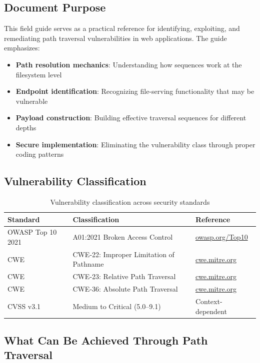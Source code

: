 \documentclass[11pt,letterpaper]{article}
\newcommand{\inlinecode}[1]{\texttt{\detokenize{#1}}}
\begin{document}
\subsection{Document Purpose}

This field guide serves as a practical reference for identifying, exploiting, and remediating path traversal vulnerabilities in web applications. The guide emphasizes:

\begin{itemize}
  \item \textbf{Path resolution mechanics}: Understanding how \inlinecode{../} sequences work at the filesystem level
  \item \textbf{Endpoint identification}: Recognizing file-serving functionality that may be vulnerable
  \item \textbf{Payload construction}: Building effective traversal sequences for different depths
  \item \textbf{Secure implementation}: Eliminating the vulnerability class through proper coding patterns
\end{itemize}

\subsection{Vulnerability Classification}

\begin{table}[htbp]
\centering
\begin{tabular}{@{}lll@{}}
\toprule
\textbf{Standard} & \textbf{Classification} & \textbf{Reference} \\
\midrule
OWASP Top 10 2021 & A01:2021 Broken Access Control & \url{owasp.org/Top10} \\
CWE & CWE-22: Improper Limitation of Pathname & \url{cwe.mitre.org} \\
CWE & CWE-23: Relative Path Traversal & \url{cwe.mitre.org} \\
CWE & CWE-36: Absolute Path Traversal & \url{cwe.mitre.org} \\
CVSS v3.1 & Medium to Critical (5.0--9.1) & Context-dependent \\
\bottomrule
\end{tabular}
\caption{Vulnerability classification across security standards}
\end{table}

\subsection{What Can Be Achieved Through Path Traversal}
\end{document}
